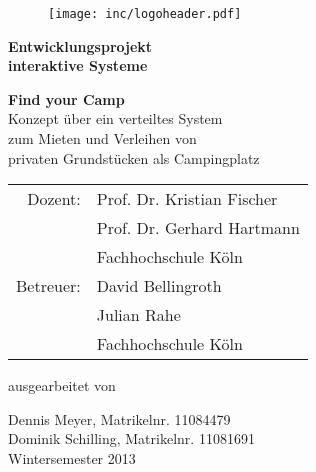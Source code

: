 
\begin{titlepage}

\begin{center}

\begin{figure}[!ht]
	\centering
		\texttt{[image: inc/logoheader.pdf]}
\end{figure}

\vspace{4.0cm}

\begin{Huge}
	\textbf{Entwicklungsprojekt}\\
	\vspace{0.1cm}
	\textbf{interaktive Systeme}\\
	
\end{Huge}

\vspace{0.8cm}

\begin{LARGE}
	\textbf{Find your Camp}\\
	\vspace{0.2cm}
	Konzept über ein verteiltes System\\
	\vspace{0.1cm}
	zum Mieten und Verleihen von \\
	\vspace{0.1cm}
	privaten Grundstücken als Campingplatz\\
\end{LARGE}

\vspace{2cm}

\begin{tabular}{rl}
        Dozent:  &  Prof. Dr. Kristian Fischer\\
       		 	 &  Prof. Dr. Gerhard Hartmann\\
       			 &  \small Fachhochschule Köln \\[1.0em]
      Betreuer:  &  David Bellingroth\\
				 &  Julian Rahe\\
       			 &  \small Fachhochschule Köln\\
\end{tabular}

\vspace{1.6cm}

\begin{large}
	ausgearbeitet von\\
	\vspace{0.2cm}
\end{large}

\begin{Large}
	Dennis Meyer, Matrikelnr. 11084479\\
	Dominik Schilling, Matrikelnr. 11081691\\
	\vspace{1cm}
	Wintersemester 2013
\end{Large}

\end{center}

\end{titlepage}
